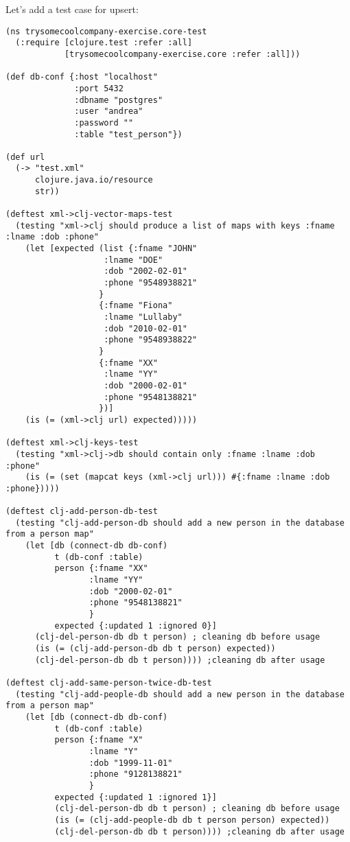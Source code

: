 \documentclass[11pt]{article}
\begin{document}
Let's add a test case for upsert:
\begin{verbatim}
(ns trysomecoolcompany-exercise.core-test
  (:require [clojure.test :refer :all]
            [trysomecoolcompany-exercise.core :refer :all]))

(def db-conf {:host "localhost" 
              :port 5432 
              :dbname "postgres" 
              :user "andrea" 
              :password "" 
              :table "test_person"})

(def url 
  (-> "test.xml"
      clojure.java.io/resource
      str))

(deftest xml->clj-vector-maps-test
  (testing "xml->clj should produce a list of maps with keys :fname :lname :dob :phone"
    (let [expected (list {:fname "JOHN" 
                    :lname "DOE" 
                    :dob "2002-02-01"
                    :phone "9548938821"
                   } 
                   {:fname "Fiona"
                    :lname "Lullaby"
                    :dob "2010-02-01"
                    :phone "9548938822"
                   }
                   {:fname "XX"
                    :lname "YY"
                    :dob "2000-02-01"
                    :phone "9548138821"
                   })]
    (is (= (xml->clj url) expected)))))

(deftest xml->clj-keys-test
  (testing "xml->clj->db should contain only :fname :lname :dob :phone"
    (is (= (set (mapcat keys (xml->clj url))) #{:fname :lname :dob :phone}))))

(deftest clj-add-person-db-test
  (testing "clj-add-person-db should add a new person in the database from a person map"
    (let [db (connect-db db-conf)
          t (db-conf :table)
          person {:fname "XX"
                 :lname "YY"
                 :dob "2000-02-01"
                 :phone "9548138821"
                 }
          expected {:updated 1 :ignored 0}]
      (clj-del-person-db db t person) ; cleaning db before usage
      (is (= (clj-add-person-db db t person) expected))
      (clj-del-person-db db t person)))) ;cleaning db after usage

(deftest clj-add-same-person-twice-db-test
  (testing "clj-add-people-db should add a new person in the database from a person map"
    (let [db (connect-db db-conf)
          t (db-conf :table)
          person {:fname "X"
                 :lname "Y"
                 :dob "1999-11-01"
                 :phone "9128138821"
                 }
          expected {:updated 1 :ignored 1}]
          (clj-del-person-db db t person) ; cleaning db before usage
          (is (= (clj-add-people-db db t person person) expected))
          (clj-del-person-db db t person)))) ;cleaning db after usage


\end{verbatim}
\end{document}
